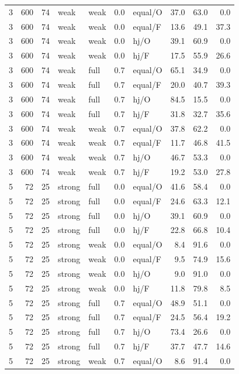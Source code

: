 {\begin{longtable}{@{}rrrllllrrr@{}}
3 & 600 & 74 & weak & weak & 0.0 & equal/O & 37.0 & 63.0 & 0.0\\
3 & 600 & 74 & weak & weak & 0.0 & equal/F & 13.6 & 49.1 & 37.3\\
3 & 600 & 74 & weak & weak & 0.0 & hj/O & 39.1 & 60.9 & 0.0\\
3 & 600 & 74 & weak & weak & 0.0 & hj/F & 17.5 & 55.9 & 26.6\\
3 & 600 & 74 & weak & full & 0.7 & equal/O & 65.1 & 34.9 & 0.0\\
3 & 600 & 74 & weak & full & 0.7 & equal/F & 20.0 & 40.7 & 39.3\\
3 & 600 & 74 & weak & full & 0.7 & hj/O & 84.5 & 15.5 & 0.0\\
3 & 600 & 74 & weak & full & 0.7 & hj/F & 31.8 & 32.7 & 35.6\\
3 & 600 & 74 & weak & weak & 0.7 & equal/O & 37.8 & 62.2 & 0.0\\
3 & 600 & 74 & weak & weak & 0.7 & equal/F & 11.7 & 46.8 & 41.5\\
3 & 600 & 74 & weak & weak & 0.7 & hj/O & 46.7 & 53.3 & 0.0\\
3 & 600 & 74 & weak & weak & 0.7 & hj/F & 19.2 & 53.0 & 27.8\\
5 & 72 & 25 & strong & full & 0.0 & equal/O & 41.6 & 58.4 & 0.0\\
5 & 72 & 25 & strong & full & 0.0 & equal/F & 24.6 & 63.3 & 12.1\\
5 & 72 & 25 & strong & full & 0.0 & hj/O & 39.1 & 60.9 & 0.0\\
5 & 72 & 25 & strong & full & 0.0 & hj/F & 22.8 & 66.8 & 10.4\\
5 & 72 & 25 & strong & weak & 0.0 & equal/O & 8.4 & 91.6 & 0.0\\
5 & 72 & 25 & strong & weak & 0.0 & equal/F & 9.5 & 74.9 & 15.6\\
5 & 72 & 25 & strong & weak & 0.0 & hj/O & 9.0 & 91.0 & 0.0\\
5 & 72 & 25 & strong & weak & 0.0 & hj/F & 11.8 & 79.8 & 8.5\\
5 & 72 & 25 & strong & full & 0.7 & equal/O & 48.9 & 51.1 & 0.0\\
5 & 72 & 25 & strong & full & 0.7 & equal/F & 24.5 & 56.4 & 19.2\\
5 & 72 & 25 & strong & full & 0.7 & hj/O & 73.4 & 26.6 & 0.0\\
5 & 72 & 25 & strong & full & 0.7 & hj/F & 37.7 & 47.7 & 14.6\\
5 & 72 & 25 & strong & weak & 0.7 & equal/O & 8.6 & 91.4 & 0.0\\

\end{longtable}}
